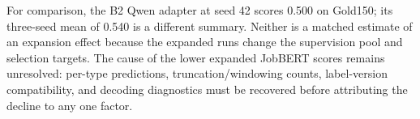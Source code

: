For comparison, the B2 Qwen adapter at seed 42 scores 0.500 on Gold150; its three-seed mean of 0.540 is a different summary. Neither is a matched estimate of an expansion effect because the expanded runs change the supervision pool and selection targets. The cause of the lower expanded JobBERT scores remains unresolved: per-type predictions, truncation/windowing counts, label-version compatibility, and decoding diagnostics must be recovered before attributing the decline to any one factor.
